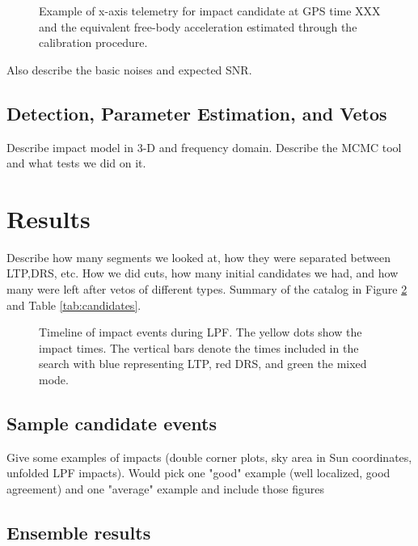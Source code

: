 \documentclass[preprint, trackchanges]{aastex61}
\begin{document}
\begin{figure}
\caption{Example of x-axis telemetry for impact candidate at GPS time XXX and the equivalent free-body acceleration estimated through the calibration procedure.\label{fig:models}}
\end{figure}

Also describe the basic noises and expected SNR.

\subsection{Detection, Parameter Estimation, and Vetos}\label{sec:MCMC}
Describe impact model in 3-D and frequency domain. Describe the MCMC tool and what tests we did on it. 

\section{Results} \label{sec:results}

Describe how many segments we looked at, how they were separated between LTP,DRS, etc. How we did cuts, how many initial candidates we had, and how many were left after vetos of different types. Summary of the catalog in Figure \ref{fig:timeline}  and Table \ref{tab:candidates}.


\begin{figure}[ht!]
\caption{Timeline of impact events during LPF. The yellow dots show the impact times. The vertical bars denote the times included in the search with blue representing LTP, red DRS, and green the mixed mode. \label{fig:timeline}}
\end{figure}

\FloatBarrier
\subsection{Sample candidate events \label{sec:samples}}

Give some examples of impacts (double corner plots, sky area in Sun coordinates, unfolded LPF impacts). Would pick one "good" example (well localized, good agreement) and one "average" example and include those figures

\FloatBarrier
\subsection{Ensemble results}
\end{document}
